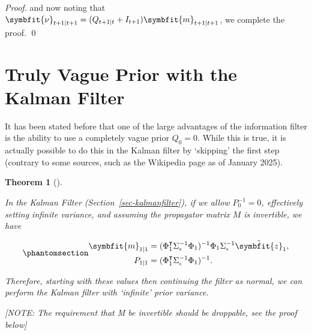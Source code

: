 \documentclass[
]{report}
\newcommand{\bv}[1]{\symbfit{#1}}
\theoremstyle{plain}
\theoremstyle{plain}
\newtheorem{theorem}{Theorem}[section]
\theoremstyle{remark}
\begin{document}
\begin{proof}
and now noting that
\(\bv\nu_{t+1\mid t+1} = (Q_{t+1\mid t} + I_{t+1}) \bv m_{t+1\mid t+1}\),
we complete the proof. \qed
\end{proof}

\section{Truly Vague Prior with the Kalman Filter}\label{sec-vagueprior}

It has been stated before that one of the large advantages of the
information filter is the ability to use a completely vague prior
\(Q_{0}=0\). While this is true, it is actually possible to do this in
the Kalman filter by `skipping' the first step (contrary to some
sources, such as the Wikipedia page as of January 2025).

\begin{theorem}[]\protect\hypertarget{thm-vagueprior}{}\label{thm-vagueprior}

In the Kalman Filter (Section~\ref{sec-kalmanfilter}), if we allow
\(P_{0}^{-1} = 0\), effectively setting infinite variance, and assuming
the propagator matrix \(M\) is invertible, we have

\begin{equation}\phantomsection\label{eq-kalmanvague}{\begin{split}
  \bv m_{1\mid1} &= (\Phi_1^\intercal \Sigma_\epsilon^{-1} \Phi_1)^{-1} \Phi_1 \Sigma_\epsilon^{-1} \tilde{\bv z}_1,\\
  P_{1\mid1} &= (\Phi_1^\intercal \Sigma_\epsilon^{-1} \Phi_1)^{-1}.
\end{split}
}\end{equation}

Therefore, starting with these values then continuing the filter as
normal, we can perform the Kalman filter with `infinite' prior variance.

{{[}NOTE: The requirement that M be invertible should be droppable, see
the proof below{]}}

\end{theorem}
\end{document}
